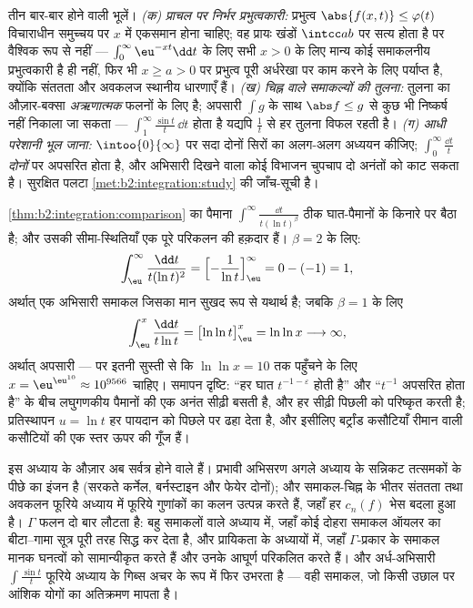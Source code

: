 \begin{remark}[सामान्य भूलें]
तीन बार-बार होने वाली भूलें। \emph{(क) प्राचल पर निर्भर प्रभुत्वकारी:}
प्रभुत्व $\abs{f(x,t)} \leq \varphi(t)$ विचाराधीन समुच्चय पर $x$ में एकसमान होना चाहिए; वह प्रायः
खंडों $\intcc ab$ पर सत्य होता है पर वैश्विक रूप से नहीं --- $\int_0^\infty\eu^{-xt}\dd t$ के लिए सभी $x > 0$
के लिए मान्य कोई समाकलनीय प्रभुत्वकारी है ही नहीं, फिर भी $x \geq a > 0$ पर
प्रभुत्व पूरी  अर्धरेखा पर काम करने के लिए पर्याप्त है, क्योंकि
संततता और अवकलज स्थानीय धारणाएँ हैं। \emph{(ख) चिह्न वाले समाकल्यों की
तुलना:} तुलना का औज़ार-बक्सा \emph{अऋणात्मक} फलनों के लिए है; अपसारी $\int g$
के साथ $\abs f \leq g$ से कुछ भी निष्कर्ष नहीं निकाला जा सकता --- $\int_1^\infty\frac{\sin t}t\,\dd t$  होता
है यद्यपि $\frac1t$ से हर तुलना विफल रहती है। \emph{(ग) आधी परेशानी भूल जाना:}
$\intoo{0}{\infty}$ पर सदा दोनों सिरों का अलग-अलग अध्ययन कीजिए; $\int_0^\infty\frac{\dd t}{t}$ \emph{दोनों} पर
अपसरित होता है, और अभिसारी दिखने वाला कोई विभाजन चुपचाप दो अनंतों को काट
सकता है। सुरक्षित पलटा \cref{met:b2:integration:study} की जाँच-सूची है।
\end{remark}

\begin{example}[एक बर्ट्रांड सीमा-स्थिति, अंक तक]\label{ex:b2:integration:bertrandboundary}
\cref{thm:b2:integration:comparison} का पैमाना $\int^\infty\frac{\dd t}{t(\ln t)^\beta}$ ठीक घात-पैमानों के किनारे पर बैठा है; और उसकी
सीमा-स्थितियाँ एक पूरे परिकलन की हक़दार हैं। $\beta = 2$ के लिए:
\[
\int_\eu^{\infty}\frac{\dd t}{t(\ln t)^2}
= \Bigl[-\frac{1}{\ln t}\Bigr]_\eu^{\infty}
= 0 - (-1) = 1 ,
\]
अर्थात् एक अभिसारी समाकल जिसका मान सुखद रूप से यथार्थ है; जबकि $\beta = 1$ के
लिए
\[
\int_\eu^{x}\frac{\dd t}{t\ln t}
= \bigl[\ln\ln t\bigr]_\eu^{x} = \ln\ln x
\longrightarrow \infty ,
\]
अर्थात् अपसारी --- पर इतनी सुस्ती से कि $\ln\ln x = 10$ तक पहुँचने के लिए $x = \eu^{\eu^{10}} \approx 10^{9566}$ चाहिए।
समापन दृष्टि: ``हर घात $t^{-1-\varepsilon}$  होती है'' और ``$t^{-1}$ अपसरित होता है''
के बीच लघुगणकीय पैमानों की एक अनंत सीढ़ी बसती है, और हर सीढ़ी पिछली को
परिष्कृत करती है; प्रतिस्थापन $u = \ln t$ हर पायदान को पिछले पर ढहा देता है,
और इसीलिए बर्ट्रांड कसौटियाँ रीमान वाली कसौटियों की एक स्तर ऊपर की गूँज
हैं।
\end{example}

\begin{remark}[इसी खंड के भीतर के परिप्रेक्ष्य]
इस अध्याय के औज़ार अब सर्वत्र होने वाले हैं। प्रभावी अभिसरण अगले अध्याय
के सन्निकट तत्समकों के पीछे का इंजन है (सरकते कर्नेल, बर्नस्टाइन और
फेयेर दोनों); और समाकल-चिह्न के भीतर संततता तथा अवकलन फूरिये अध्याय में
फूरिये गुणांकों का कलन उत्पन्न करते हैं, जहाँ हर $c_n(f)$ भेस बदला हुआ  है। $\Gamma$ फलन दो बार लौटता है: बहु समाकलों वाले अध्याय में, जहाँ कोई
दोहरा समाकल ऑयलर का बीटा--गामा सूत्र पूरी तरह सिद्ध कर देता है, और
प्रायिकता के अध्यायों में, जहाँ $\Gamma$-प्रकार के समाकल मानक घनत्वों को
सामान्यीकृत करते हैं और उनके आघूर्ण परिकलित करते हैं। और अर्ध-अभिसारी $\int\frac{\sin t}{t}$
फूरिये अध्याय के गिब्स अचर के रूप में फिर उभरता है --- वही समाकल, जो किसी
उछाल पर आंशिक योगों का अतिक्रमण मापता है।
\end{remark}

